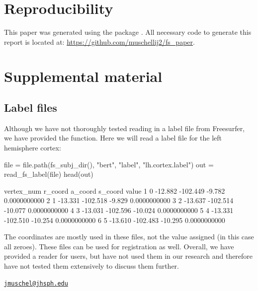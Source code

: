 \section{Reproducibility}\label{reproducibility}

This paper was generated using the  package
\citep{rticles}. All necessary code to generate this report is located
at: \url{https://github.com/muschellij2/fs_paper}.



\section{Supplemental material}\label{supplemental-material}

\subsection{Label files}\label{label-files}

Although we have not thoroughly tested reading in a label file from
Freesurfer, we have provided the  function. Here
we will read a label file for the left hemisphere cortex:

\begin{Schunk}
\begin{Sinput}
file = file.path(fs_subj_dir(), "bert", "label", "lh.cortex.label")
out = read_fs_label(file)
head(out)
\end{Sinput}
\begin{Soutput}
  vertex_num r_coord  a_coord s_coord        value
1          0 -12.882 -102.449  -9.782 0.0000000000
2          1 -13.331 -102.518  -9.829 0.0000000000
3          2 -13.637 -102.514 -10.077 0.0000000000
4          3 -13.031 -102.596 -10.024 0.0000000000
5          4 -13.331 -102.510 -10.254 0.0000000000
6          5 -13.610 -102.483 -10.295 0.0000000000
\end{Soutput}
\end{Schunk}

The coordinates are mostly used in these files, not the value assigned
(in this case all zeroes). These files can be used for registration as
well. Overall, we have provided a reader for users, but have not used
them in our research and therefore have not tested them extensively to
discuss them further.

\address{%
John Muschelli\\
Johns Hopkins Bloomberg School of Public Health\\
Department of Biostatistics\\ 615 N Wolfe St, Baltimore, MD, 21205\\
}
\href{mailto:jmuschel@jhsph.edu}{\nolinkurl{jmuschel@jhsph.edu}}

